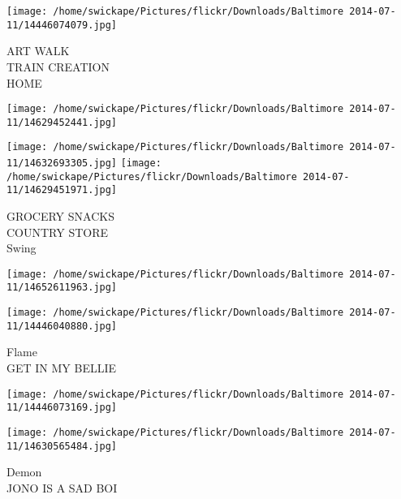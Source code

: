 \documentclass[10pt,letterpaper]{article}
\begin{document}
\vspace{0.25in}
\texttt{[image: /home/swickape/Pictures/flickr/Downloads/Baltimore 2014-07-11/14446074079.jpg]}

ART WALK\\
TRAIN CREATION\\
HOME
\pagebreak

\texttt{[image: /home/swickape/Pictures/flickr/Downloads/Baltimore 2014-07-11/14629452441.jpg]}

\vspace{0.25in}
\texttt{[image: /home/swickape/Pictures/flickr/Downloads/Baltimore 2014-07-11/14632693305.jpg]}
\texttt{[image: /home/swickape/Pictures/flickr/Downloads/Baltimore 2014-07-11/14629451971.jpg]}

GROCERY SNACKS\\
COUNTRY STORE\\
Swing
\pagebreak

\texttt{[image: /home/swickape/Pictures/flickr/Downloads/Baltimore 2014-07-11/14652611963.jpg]}

\vspace{0.25in}
\texttt{[image: /home/swickape/Pictures/flickr/Downloads/Baltimore 2014-07-11/14446040880.jpg]}

Flame\\
GET IN MY BELLIE
\pagebreak

\texttt{[image: /home/swickape/Pictures/flickr/Downloads/Baltimore 2014-07-11/14446073169.jpg]}

\vspace{0.25in}
\texttt{[image: /home/swickape/Pictures/flickr/Downloads/Baltimore 2014-07-11/14630565484.jpg]}

Demon\\
JONO IS A SAD BOI
\pagebreak
\end{document}
